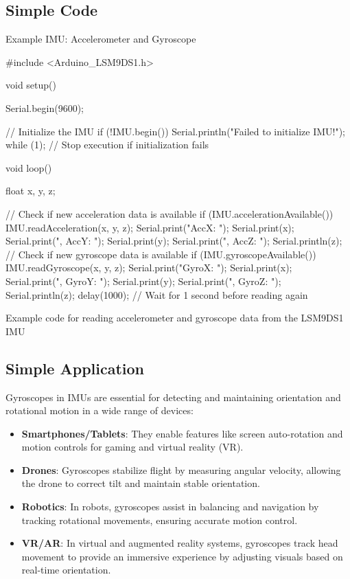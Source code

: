 \subsection{Simple Code}

Example IMU: Accelerometer and Gyroscope
\begin{code}
	\begin{Arduino}
		#include <Arduino_LSM9DS1.h>

		void setup() {
		Serial.begin(9600);

		// Initialize the IMU
		if (!IMU.begin()) {
			Serial.println("Failed to initialize IMU!");
			while (1); // Stop execution if initialization fails
		}
		}
		void loop() {
		float x, y, z;

		// Check if new acceleration data is available
		if (IMU.accelerationAvailable()) {
			IMU.readAcceleration(x, y, z);
			Serial.print("AccX: ");
			Serial.print(x);
			Serial.print(", AccY: ");
			Serial.print(y);
			Serial.print(", AccZ: ");
			Serial.println(z);
		}
		// Check if new gyroscope data is available
		if (IMU.gyroscopeAvailable()) {
			IMU.readGyroscope(x, y, z);
			Serial.print("GyroX: ");
			Serial.print(x);
			Serial.print(", GyroY: ");
			Serial.print(y);
			Serial.print(", GyroZ: ");
			Serial.println(z);
		}
		delay(1000); // Wait for 1 second before reading again
		}
	\end{Arduino}
	\caption{Example code for reading accelerometer and gyroscope data from the LSM9DS1 IMU}\label{code:IMU-example}
\end{code}

\subsection{Simple Application}
Gyroscopes in IMUs are essential for detecting and maintaining orientation and rotational motion in a wide range of devices:

\begin{itemize}
	\item \textbf{Smartphones/Tablets}: They enable features like screen auto-rotation and motion controls for gaming and virtual reality (VR).\cite{Passaro:2017}
	\item \textbf{Drones}: Gyroscopes stabilize flight by measuring angular velocity, allowing the drone to correct tilt and maintain stable orientation.\cite{Passaro:2017}
	\item \textbf{Robotics}: In robots, gyroscopes assist in balancing and navigation by tracking rotational movements, ensuring accurate motion control.\cite{Passaro:2017}
	\item \textbf{VR/AR}: In virtual and augmented reality systems, gyroscopes track head movement to provide an immersive experience by adjusting visuals based on real-time orientation.\cite{Passaro:2017}
\end{itemize}

